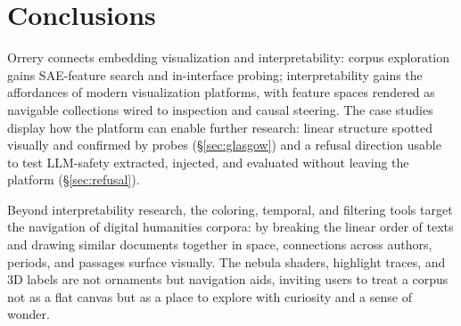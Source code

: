 \documentclass[11pt]{article}
\begin{document}



\section{Conclusions}

Orrery connects embedding visualization and interpretability: corpus exploration gains SAE-feature search and in-interface probing; interpretability gains the affordances of modern visualization platforms, with feature spaces rendered as navigable
collections wired to inspection and causal steering. The case studies display how the platform can enable further research: linear structure spotted visually and confirmed by probes (\S\ref{sec:glasgow}) and a refusal direction usable to test LLM-safety extracted, injected, and evaluated without leaving the platform (\S\ref{sec:refusal}).

Beyond interpretability research, the coloring, temporal, and filtering tools target the navigation of digital humanities corpora: by breaking the linear order of texts and drawing similar documents together in space, connections across authors, periods, and passages surface visually. The nebula shaders, highlight traces, and 3D labels are not ornaments but navigation aids, inviting users to treat a corpus not as a flat canvas but as a place to explore with curiosity and a sense of wonder.
\end{document}
